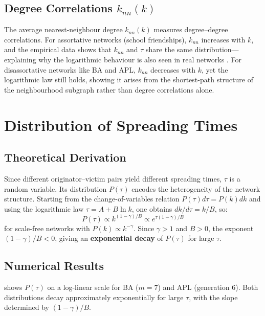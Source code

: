 \documentclass[9pt,a4paper,twocolumn,twoside]{tau-class/tau}
\begin{document}
\subsection{Degree Correlations $k_{nn}(k)$}

The average nearest-neighbour degree $k_{nn}(k)$ measures degree--degree correlations. For assortative networks (school friendships), $k_{nn}$ increases with $k$, and the empirical data shows that $k_{nn}$ and $\tau$ share the same distribution---explaining why the logarithmic behaviour is also seen in real networks \cite{lind2007pre}. For disassortative networks like BA and APL, $k_{nn}$ decreases with $k$, yet the logarithmic law still holds, showing it arises from the shortest-path structure of the neighbourhood subgraph rather than degree correlations alone.

\section{Distribution of Spreading Times}\label{sec:ptau}

\subsection{Theoretical Derivation}

Since different originator--victim pairs yield different spreading times, $\tau$ is a random variable. Its distribution $P(\tau)$ encodes the heterogeneity of the network structure. Starting from the change-of-variables relation $P(\tau)d\tau = P(k)dk$ and using the logarithmic law $\tau = A + B\ln k$, one obtains $dk/d\tau = k/B$, so:
\begin{equation}\label{eq:ptau}
    P(\tau) \propto k^{(1-\gamma)/B} \propto e^{\tau(1-\gamma)/B}
\end{equation}
for scale-free networks with $P(k) \propto k^{-\gamma}$. Since $\gamma > 1$ and $B > 0$, the exponent $(1-\gamma)/B < 0$, giving an \textbf{exponential decay} of $P(\tau)$ for large $\tau$.

\subsection{Numerical Results}

 shows $P(\tau)$ on a log-linear scale for BA ($m=7$) and APL (generation 6). Both distributions decay approximately exponentially for large $\tau$, with the slope determined by $(1-\gamma)/B$.
\end{document}
